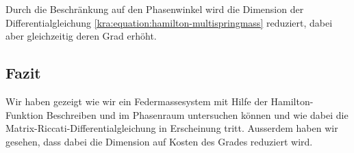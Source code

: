 Durch die Beschränkung auf den Phasenwinkel wird die Dimension der Differentialgleichung \eqref{kra:equation:hamilton-multispringmass} reduziert, dabei aber gleichzeitig deren Grad erhöht.

\subsection{Fazit}
Wir haben gezeigt wie wir ein Federmassesystem mit Hilfe der Hamilton-Funktion Beschreiben und im Phasenraum untersuchen können und wie dabei die Matrix-Riccati-Differentialgleichung in Erscheinung tritt.
Ausserdem haben wir gesehen, dass dabei die Dimension auf Kosten des Grades reduziert wird.